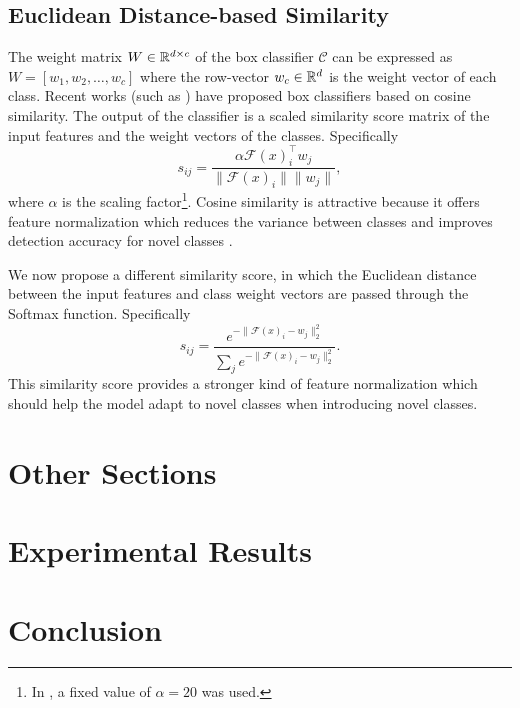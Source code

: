 \documentclass{article}
\begin{document}
\subsection{Euclidean Distance-based Similarity}
The weight matrix $W \in \mathbb{R}^{d \times c}$ of the box classifier $\mathcal{C}$ can be expressed as 
  $W = [w_1, w_2, \dots, w_c]$ 
where the row-vector  $w_c \in \mathbb{R}^d$ is the weight vector of each class.  
Recent works (such as \cite{VinyalsBLKW16,chen2019closer,qi2018low,gidaris2018dynamic}) have proposed 
box classifiers based on cosine similarity. The output of the classifier is a scaled similarity score matrix 
of the input features and the weight vectors of the classes. Specifically
\begin{equation}
  s_{ij} = \frac{\alpha \mathcal{F}(x)_i^\top w_j}{\| \mathcal{F}(x)_i \| \|w_j\|},
\end{equation}
where $\alpha$ is the scaling factor\footnote{In \cite{wang2020frustratingly}, a fixed value 
of $\alpha = 20$ was used.}. 
Cosine similarity is attractive because it offers feature normalization which reduces the 
variance between classes and improves detection accuracy for novel classes \cite{wang2020frustratingly}. 

We now propose a different similarity score, in which the Euclidean distance between the 
input features and class weight vectors are passed through the Softmax function. Specifically
\begin{equation}
  s_{ij} = \frac{e^{-\|\mathcal{F}(x)_i - w_j\|_2^2}}{\sum_{j} e^{-\|\mathcal{F}(x)_i - w_j\|_2^2}}.
\end{equation}
This similarity score provides a stronger kind of feature normalization which should help the model 
adapt to novel classes when introducing novel classes. 


\section{Other Sections}

\section{Experimental Results}

\section{Conclusion}
\end{document}
